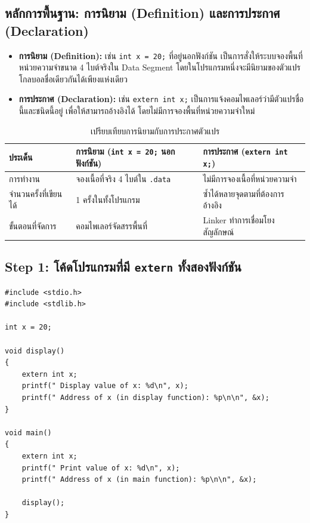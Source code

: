 \documentclass[a4paper,11pt]{article}
\newcommand{\code}[1]{\texttt{#1}}
\begin{document}
\subsection{หลักการพื้นฐาน: การนิยาม (Definition) และการประกาศ (Declaration)}

\begin{itemize}[leftmargin=*]
  \item \textbf{การนิยาม (Definition):} เช่น \code{int x = 20;} ที่อยู่นอกฟังก์ชัน เป็นการสั่งให้ระบบจองพื้นที่หน่วยความจำขนาด 4 ไบต์จริงใน Data Segment โดยในโปรแกรมหนึ่งจะมีนิยามของตัวแปรโกลบอลชื่อเดียวกันได้เพียงแห่งเดียว
  \item \textbf{การประกาศ (Declaration):} เช่น \code{extern int x;} เป็นการแจ้งคอมไพเลอร์ว่ามีตัวแปรชื่อนี้และชนิดนี้อยู่ เพื่อให้สามารถอ้างอิงได้ โดยไม่มีการจองพื้นที่หน่วยความจำใหม่
\end{itemize}

\begin{table}[H]
\centering\small
\caption{เปรียบเทียบการนิยามกับการประกาศตัวแปร}
\begin{tabular}{p{3.2cm}p{5.4cm}p{5.4cm}}
\toprule
\textbf{ประเด็น} & \textbf{การนิยาม (\code{int x = 20;} นอกฟังก์ชัน)} & \textbf{การประกาศ (\code{extern int x;})} \\
\midrule
การทำงาน & จองเนื้อที่จริง 4 ไบต์ใน \code{.data} & ไม่มีการจองเนื้อที่หน่วยความจำ \\
จำนวนครั้งที่เขียนได้ & 1 ครั้งในทั้งโปรแกรม & ซ้ำได้หลายจุดตามที่ต้องการอ้างอิง \\
ขั้นตอนที่จัดการ & คอมไพเลอร์จัดสรรพื้นที่ & Linker ทำการเชื่อมโยงสัญลักษณ์ \\
\bottomrule
\end{tabular}
\end{table}

\subsection{Step 1: โค้ดโปรแกรมที่มี \code{extern} ทั้งสองฟังก์ชัน}

\begin{lstlisting}[style=cstyle,caption={\code{src/q2\_extern.c} โค้ดเริ่มต้นตามใบงาน}]
#include <stdio.h>
#include <stdlib.h>

int x = 20;

void display()
{
    extern int x;
    printf(" Display value of x: %d\n", x);
    printf(" Address of x (in display function): %p\n\n", &x);
}

void main()
{
    extern int x;
    printf(" Print value of x: %d\n", x);
    printf(" Address of x (in main function): %p\n\n", &x);

    display();
}
\end{lstlisting}
\end{document}
